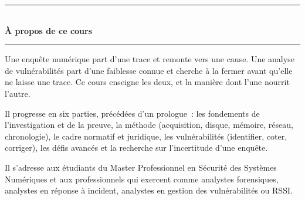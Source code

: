 \documentclass[12pt, twoside, openright, a4paper]{book}
\begin{document}
    \nocite{*}
    \printbibliography[heading=bibintoc, title={Références bibliographiques}]

    \printindex

\clearpage
\thispagestyle{empty}
\pagecolor{CouleurPrimaire}


\vspace*{2.5cm}

\begin{center}
    {\color{CouleurAccent}\rule{0.6\linewidth}{1pt}}\\[1.5ex]
    {\color{white}\Large\bfseries À propos de ce cours}\\[1.5ex]
    {\color{CouleurAccent}\rule{0.6\linewidth}{1pt}}
\end{center}

\vspace{1cm}

\begin{center}
\begin{minipage}{0.75\textwidth}
\color{white!85!gray}
Une enquête numérique part d'une trace et remonte vers une cause. Une
analyse de vulnérabilités part d'une faiblesse connue et cherche à la
fermer avant qu'elle ne laisse une trace. Ce cours enseigne les deux, et
la manière dont l'une nourrit l'autre.

\medskip

Il progresse en six parties, précédées d'un prologue~: les fondements de
l'investigation et de la preuve, la méthode (acquisition, disque, mémoire,
réseau, chronologie), le cadre normatif et juridique, les vulnérabilités
(identifier, coter, corriger), les défis avancés et la recherche sur
l'incertitude d'une enquête.

\medskip

Il s'adresse aux étudiants du Master Professionnel en Sécurité des Systèmes
Numériques et aux professionnels qui exercent comme analystes forensiques,
analystes en réponse à incident, analystes en gestion des vulnérabilités ou
RSSI.
\end{minipage}
\end{center}
\end{document}
